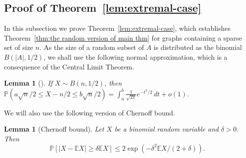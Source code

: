 \documentclass[11pt, a4paper]{article}
\newtheorem{lemma}[theorem]{Lemma}
\theoremstyle{definition}
\newcommand{\<}{\subseteq}
\begin{document}
\subsection{Proof of Theorem~\ref{lem:extremal-case}}
In this subsection we prove Theorem~\ref{lem:extremal-case}, which establishes Theorem~\ref{thm:the random version of main thm} for graphs containing a sparse set of size $n$. 
As the size of a random subset of $A$ is distributed as the binomial $B(|A|, 1/2)$, we shall use the following normal approximation, which is a consequence of the Central Limit Theorem.



\begin{lemma}[\cite{Keevash2025}]\label{lem-int}
If $X\sim B(n,1/2)$, then $\mathbb{P}(a\sqrt{n}/2\leq X-n/2\leq b\sqrt{n}/2)=\int_a^b \frac{1}{\sqrt{2\pi}}e^{-t^2/2}\,dt+o(1)$.
\end{lemma}
We will also use the following version of Chernoff bound.
\begin{lemma}[Chernoff bound]
    Let $X$ be a binomial random variable and $\delta>0$. Then 
    $$
    \mathbb{P}[|X-\mathbb{E}X|\geq \delta \mathbb{E}X]\leq 2\exp(-\delta^2\mathbb{E}X/(2+\delta)).
    $$
\end{lemma}

\end{document}
